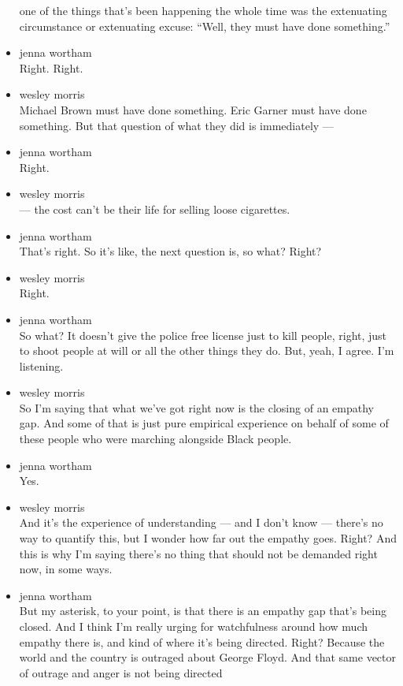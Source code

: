 \begin{itemize}
  one of the things that's been happening the whole time was the
  extenuating circumstance or extenuating excuse: ``Well, they must have
  done something.''
\item
  jenna wortham\\
  Right. Right.
\item
  wesley morris\\
  Michael Brown must have done something. Eric Garner must have done
  something. But that question of what they did is immediately ---
\item
  jenna wortham\\
  Right.
\item
  wesley morris\\
  --- the cost can't be their life for selling loose cigarettes.
\item
  jenna wortham\\
  That's right. So it's like, the next question is, so what? Right?
\item
  wesley morris\\
  Right.
\item
  jenna wortham\\
  So what? It doesn't give the police free license just to kill people,
  right, just to shoot people at will or all the other things they do.
  But, yeah, I agree. I'm listening.
\item
  wesley morris\\
  So I'm saying that what we've got right now is the closing of an
  empathy gap. And some of that is just pure empirical experience on
  behalf of some of these people who were marching alongside Black
  people.
\item
  jenna wortham\\
  Yes.
\item
  wesley morris\\
  And it's the experience of understanding --- and I don't know ---
  there's no way to quantify this, but I wonder how far out the empathy
  goes. Right? And this is why I'm saying there's no thing that should
  not be demanded right now, in some ways.
\item
  jenna wortham\\
  But my asterisk, to your point, is that there is an empathy gap that's
  being closed. And I think I'm really urging for watchfulness around
  how much empathy there is, and kind of where it's being directed.
  Right? Because the world and the country is outraged about George
  Floyd. And that same vector of outrage and anger is not being directed

\end{itemize}
